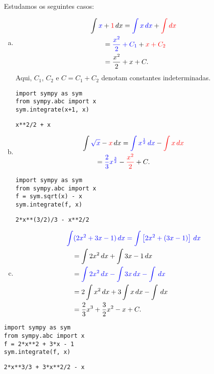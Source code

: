 \begin{ex}
  Estudamos os seguintes casos:
  \begin{enumerate}[a)]
  \item
    \begin{align}
      & \int {\color{blue}x} + {\color{red}1}\,dx = {\color{blue}\int x\,dx} + {\color{red}\int dx}\\
      &\text{}\qquad = {\color{blue}\frac{x^2}{2} + C_1} + {\color{red}x + C_2}\\
      &\text{}\qquad = \frac{x^2}{2} + x + C.
    \end{align}
    Aqui, $C_1$, $C_2$ e $C = C_1+C_2$ denotam constantes indeterminadas.

\begin{lstlisting}
import sympy as sym
from sympy.abc import x
sym.integrate(x+1, x)
\end{lstlisting}

\begin{verbatim}
x**2/2 + x
\end{verbatim}

  \item 
    \begin{align}
      & \int {\color{blue}\sqrt{x}} - {\color{red}x}\,dx = {\color{blue}\int x^{\frac{1}{2}}\,dx} - {\color{red}\int x\,dx}\\
      &\text{}\qquad = {\color{blue}\frac{2}{3}x^{\frac{3}{2}}} - {\color{red}\frac{x^2}{2}} + C.
    \end{align}

\begin{lstlisting}
import sympy as sym
from sympy.abc import x
f = sym.sqrt(x) - x
sym.integrate(f, x)
\end{lstlisting}

\begin{verbatim}
2*x**(3/2)/3 - x**2/2
\end{verbatim}

  \item
      \begin{align}
      & \color{blue}\int (2x^2 + 3x - 1)\,dx = \int \left[2x^2 + (3x - 1)\right]\,dx\\
      &\text{}\quad = \int 2x^2\,dx + \int 3x - 1 \,dx \\
      &\text{}\quad = \color{blue}\int 2x^2\,dx - \int 3x\,dx - \int \,dx\\
      &\text{}\quad = 2\int x^2\,dx + 3\int x\,dx - \int \,dx\\
      &\text{}\quad = \frac{2}{3}x^3 + \frac{3}{2}x^2 - x + C.
      \end{align}

    \end{enumerate}

\begin{lstlisting}
import sympy as sym
from sympy.abc import x
f = 2*x**2 + 3*x - 1
sym.integrate(f, x)
\end{lstlisting}

\begin{verbatim}
2*x**3/3 + 3*x**2/2 - x
\end{verbatim}
\end{ex}


